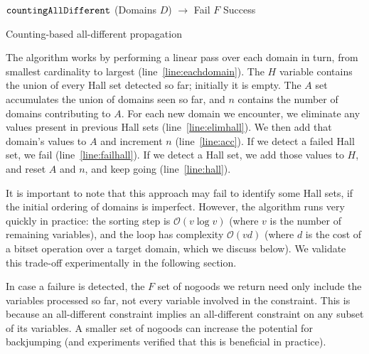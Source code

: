 \documentclass{llncs}
\newcommand{\lineref}[1]{line~\ref{#1}}
\begin{document}
\begin{algorithm}[h]
\DontPrintSemicolon
\nl $\FuncSty{countingAllDifferent}$ (Domains $D$) $\rightarrow$ Fail $F$  Success \;
\nl {}
\caption{Counting-based all-different propagation}
\label{algorithm:cad}
\end{algorithm}

The algorithm works by performing a linear pass over each domain in turn, from smallest cardinality
to largest (\lineref{line:eachdomain}). The $H$ variable contains the union of every Hall set
detected so far; initially it is empty. The $A$ set accumulates the union of domains seen so far,
and $n$ contains the number of domains contributing to $A$. For each new domain we encounter, we
eliminate any values present in previous Hall sets (\lineref{line:elimhall}). We then add that
domain's values to $A$ and increment $n$ (\lineref{line:acc}). If we detect a failed Hall set, we
fail (\lineref{line:failhall}).  If we detect a Hall set, we add those values to $H$, and reset $A$
and $n$, and keep going (\lineref{line:hall}).

It is important to note that this approach may fail to identify some Hall sets, if the initial
ordering of domains is imperfect. However, the algorithm runs very quickly in practice: the
sorting step is $\mathcal{O}(v \log{} v)$ (where $v$ is the number of remaining variables), and the
loop has complexity $\mathcal{O}(v d)$ (where $d$ is the cost of a bitset operation over a target
domain, which we discuss below). We validate this trade-off experimentally in the following section.

In case a failure is detected, the $F$ set of nogoods we return need only include the variables
processed so far, not every variable involved in the constraint. This is because an all-different
constraint implies an all-different constraint on any subset of its variables. A smaller set of
nogoods can increase the potential for backjumping (and experiments verified that this is beneficial
in practice).
\end{document}
